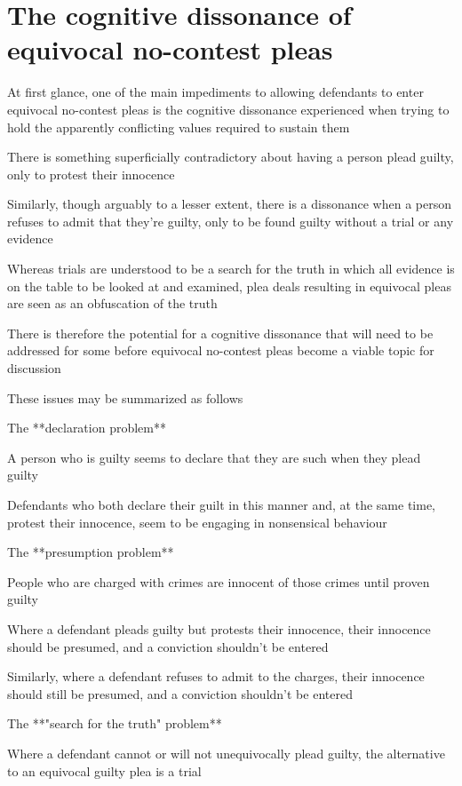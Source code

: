 \section{The cognitive dissonance of equivocal no-contest pleas}

At first glance, one of the main impediments to allowing defendants to enter equivocal no-contest pleas is the cognitive dissonance experienced when trying to hold the apparently conflicting values required to sustain them

There is something superficially contradictory about having a person plead guilty, only to protest their innocence

Similarly, though arguably to a lesser extent, there is a dissonance when a person refuses to admit that they're guilty, only to be found guilty without a trial or any evidence

Whereas trials are understood to be a search for the truth in which all evidence is on the table to be looked at and examined, plea deals resulting in equivocal pleas are seen as an obfuscation of the truth

There is therefore the potential for a cognitive dissonance that will need to be addressed for some before equivocal no-contest pleas become a viable topic for discussion

These issues may be summarized as follows

The **declaration problem**

A person who is guilty seems to declare that they are such when they plead guilty

Defendants who both declare their guilt in this manner and, at the same time, protest their innocence, seem to be engaging in nonsensical behaviour

The **presumption problem**

People who are charged with crimes are innocent of those crimes until proven guilty

Where a defendant pleads guilty but protests their innocence, their innocence should be presumed, and a conviction shouldn't be entered

Similarly, where a defendant refuses to admit to the charges, their innocence should still be presumed, and a conviction shouldn't be entered

The **"search for the truth" problem**

Where a defendant cannot or will not unequivocally plead guilty, the alternative to an equivocal guilty plea is a trial

